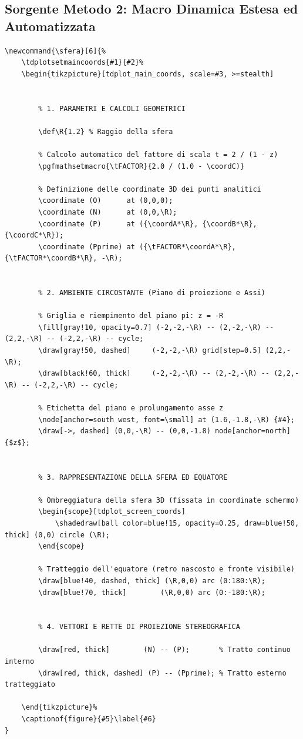 \documentclass[11pt]{article}
\newcommand{\sfera}[6]{%
    \tdplotsetmaincoords{#1}{#2}%
    \begin{tikzpicture}[tdplot_main_coords, scale=#3, >=stealth]
        
        \def\R{1.2} %
        
        \pgfmathsetmacro{\tFACTOR}{2.0 / (1.0 - \coordC)}

        \coordinate (O) at (0,0,0);
        \coordinate (N) at (0,0,\R);
        \coordinate (P) at ({\coordA*\R}, {\coordB*\R}, {\coordC*\R}); 
        \coordinate (Pprime) at ({\tFACTOR*\coordA*\R}, {\tFACTOR*\coordB*\R}, -\R);

        \fill[gray!10, opacity=0.7] (-2,-2,-\R) -- (2,-2,-\R) -- (2,2,-\R) -- (-2,2,-\R) -- cycle;
        \draw[gray!50, dashed] (-2,-2,-\R) grid[step=0.5] (2,2,-\R);
        \draw[black!60, thick] (-2,-2,-\R) -- (2,-2,-\R) -- (2,2,-\R) -- (-2,2,-\R) -- cycle;
        \node[anchor=south west, font=\small] at (1.6,-1.8,-\R) {#4};

        \draw[->,dashed] (0,0,-\R) -- (0,0,-1.8) node[anchor=north]{$z$};

        \begin{scope}[tdplot_screen_coords]
            \shadedraw[ball color=blue!15, opacity=0.25, draw=blue!50, thick] (0,0) circle (\R);
        \end{scope}

        \draw[blue!40, dashed, thick] (\R,0,0) arc (0:180:\R);
        \draw[blue!70, thick] (\R,0,0) arc (0:-180:\R);

        \draw[red, thick] (N) -- (P);
        \draw[red, thick, dashed] (P) -- (Pprime);

        \filldraw[black] (N) circle (0.6pt) node[anchor=south, font=\small] {$N$};
        \filldraw[black] (P) circle (0.6pt) node[anchor=south west, font=\small] {$P$};
        \filldraw[red] (Pprime) circle (0.8pt) node[anchor=north west, font=\small] {$P'$};
        \filldraw[gray] (O) circle (0.5pt) node[anchor=east, font=\small] {$O$};
    \end{tikzpicture}%
    \captionof{figure}{#5}\label{#6}
}
\begin{document}
\subsection*{Sorgente Metodo 2: Macro Dinamica Estesa ed Automatizzata}
\begin{lstlisting}
\newcommand{\sfera}[6]{%
    \tdplotsetmaincoords{#1}{#2}%
    \begin{tikzpicture}[tdplot_main_coords, scale=#3, >=stealth]
        
        
        % 1. PARAMETRI E CALCOLI GEOMETRICI
        
        \def\R{1.2} % Raggio della sfera
        
        % Calcolo automatico del fattore di scala t = 2 / (1 - z)
        \pgfmathsetmacro{\tFACTOR}{2.0 / (1.0 - \coordC)}
        
        % Definizione delle coordinate 3D dei punti analitici
        \coordinate (O)      at (0,0,0);
        \coordinate (N)      at (0,0,\R);
        \coordinate (P)      at ({\coordA*\R}, {\coordB*\R}, {\coordC*\R}); 
        \coordinate (Pprime) at ({\tFACTOR*\coordA*\R}, {\tFACTOR*\coordB*\R}, -\R);
        
        
        % 2. AMBIENTE CIRCOSTANTE (Piano di proiezione e Assi)
        
        % Griglia e riempimento del piano pi: z = -R
        \fill[gray!10, opacity=0.7] (-2,-2,-\R) -- (2,-2,-\R) -- (2,2,-\R) -- (-2,2,-\R) -- cycle;
        \draw[gray!50, dashed]     (-2,-2,-\R) grid[step=0.5] (2,2,-\R);
        \draw[black!60, thick]     (-2,-2,-\R) -- (2,-2,-\R) -- (2,2,-\R) -- (-2,2,-\R) -- cycle;
        
        % Etichetta del piano e prolungamento asse z
        \node[anchor=south west, font=\small] at (1.6,-1.8,-\R) {#4};
        \draw[->, dashed] (0,0,-\R) -- (0,0,-1.8) node[anchor=north]{$z$};
        
        
        % 3. RAPPRESENTAZIONE DELLA SFERA ED EQUATORE
        
        % Ombreggiatura della sfera 3D (fissata in coordinate schermo)
        \begin{scope}[tdplot_screen_coords]
            \shadedraw[ball color=blue!15, opacity=0.25, draw=blue!50, thick] (0,0) circle (\R);
        \end{scope}
        
        % Tratteggio dell'equatore (retro nascosto e fronte visibile)
        \draw[blue!40, dashed, thick] (\R,0,0) arc (0:180:\R);
        \draw[blue!70, thick]        (\R,0,0) arc (0:-180:\R);
        
        
        % 4. VETTORI E RETTE DI PROIEZIONE STEREOGRAFICA
        
        \draw[red, thick]        (N) -- (P);       % Tratto continuo interno
        \draw[red, thick, dashed] (P) -- (Pprime); % Tratto esterno tratteggiato
        
    \end{tikzpicture}%
    \captionof{figure}{#5}\label{#6}
}
\end{lstlisting}
\end{document}
